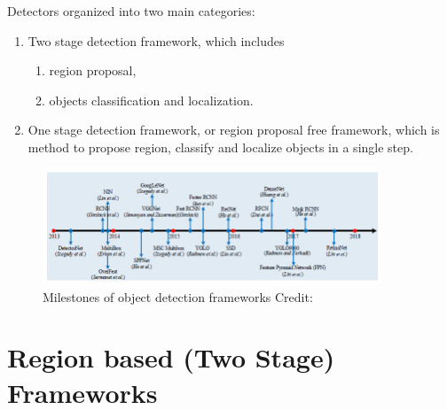 \documentclass{beamer}
\begin{document}
\begin{frame}
	Detectors organized into two main categories:
	\begin{enumerate}
		\item Two stage detection framework, which includes
			\begin{enumerate}
				\item region proposal,
				\item objects classification and localization.
			\end{enumerate}
		\item One stage detection framework, or region proposal free framework, which is method to propose region, classify and localize objects in a single step.
	\end{enumerate}
	\begin{figure}
		\includegraphics[width=0.9\textwidth]{images/detection_framework.PNG}
		\caption{Milestones of object detection frameworks
			\hbox{\scriptsize Credit:}
		}
	\end{figure}
\end{frame}


\section{Region based (Two Stage) Frameworks}
\end{document}
